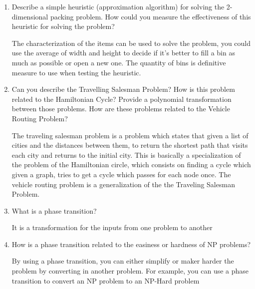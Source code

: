 \documentclass{article}
\begin{document}
\begin{enumerate}
    \item Describe a simple heuristic (approximation algorithm) for solving the 2-dimensional packing problem. How could you measure the effectiveness of this heuristic for solving the problem?

    The characterization of the items can be used to solve the problem, you could use the average of width and height to decide if it's better to fill a bin as much as possible or open a new one. The quantity of bins is definitive measure to use when testing the heuristic.

    \item Can you describe the Travelling Salesman Problem? How is this problem related to the Hamiltonian Cycle? Provide a polynomial transformation between those problems. How are these problems related
    to the Vehicle Routing Problem?

    The traveling salesman problem is a problem which states that given a list of cities and the distances between them, to return the shortest path that visits each city and returns to the initial city. This is basically a specialization of the problem of the Hamiltonian circle, which consists on finding a cycle which given a graph, tries to get a cycle which passes for each node once. The vehicle routing problem is a generalization of the the Traveling Salesman Problem.

    \item What is a phase transition?
    
    It is a transformation for the inputs from one problem to another

    \item How is a phase transition related to the easiness or hardness of NP problems?

    By using a phase transition, you can either simplify or maker harder the problem by converting in another problem. For example, you can use a phase transition to convert an NP problem to an NP-Hard problem

\end{enumerate}
\end{document}
